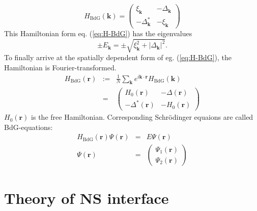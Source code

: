 \begin{equation}
H_\text{BdG}\left(\mathbf{k} \right) = \begin{pmatrix}
\xi_\mathbf{k} &  - \Delta_\mathbf{k}\\
- \Delta^*_\mathbf{k} & - \xi_\mathbf{k}
\end{pmatrix} \label{eq:H-BdG}
\end{equation}
This Hamiltonian form eq. (\ref{eq:H-BdG}) has the eigenvalues
\begin{equation}
 \pm E_\mathbf{k} = \pm \sqrt{\xi_\mathbf{k}^2 + |\Delta_\mathbf{k}|^2  }.
\end{equation}
To finally arrive at the spatially dependent form of eg. (\ref{eq:H-BdG}), the Hamiltonian is Fourier-transformed.
\begin{eqnarray}
H_\text{BdG} \left( \mathbf{r} \right) &:=& \frac{1}{N} \sum_\mathbf{k} e^{i \mathbf{k \cdot r}} H_\text{BdG}\left( \mathbf{k} \right) \\
&=& \begin{pmatrix}
H_0\left( \mathbf{r} \right)  &  - \Delta \left( \mathbf{r} \right) \\
- \Delta^* \left( \mathbf{r} \right)  & - H_0 \left( \mathbf{r} \right) 
\end{pmatrix}
\end{eqnarray}
$H_0 \left( \mathbf{r} \right) $ is the free Hamiltonian. Corresponding Schr\"odinger equaions are called BdG-equations:
\begin{eqnarray}
H_\text{BdG} \left( \mathbf{r} \right) \Psi\left( \mathbf{r} \right) &=& E \Psi\left( \mathbf{r} \right)\\
\Psi\left( \mathbf{r} \right)  &=& \begin{pmatrix}
\Psi_1\left( \mathbf{r} \right) \\ \Psi_2\left( \mathbf{r} \right) 
\end{pmatrix}
\end{eqnarray}

\section{Theory of NS interface}

